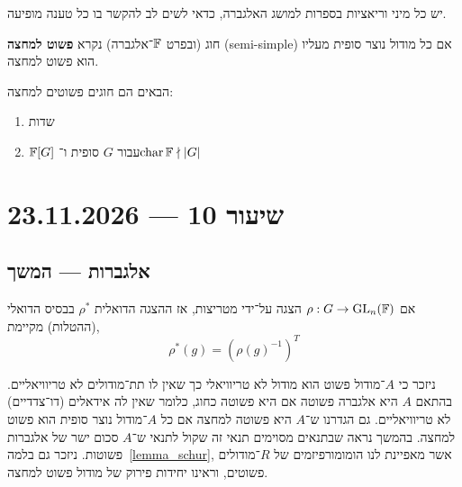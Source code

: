 \begin{remark}
	יש כל מיני וריאציות בספרות למושג האלגברה, כדאי לשים לב להקשר בו כל טענה מופיעה.
\end{remark}
\begin{definition}
	חוג (ובפרט $\mathbb{F}$־אלגברה) נקרא \textbf{פשוט למחצה} (semi-simple) אם כל מודול נוצר סופית מעליו הוא פשוט למחצה.
\end{definition}
\begin{example}
	הבאים הם חוגים פשוטים למחצה:
	\begin{enumerate}
		\item שדות
		\item $\mathbb{F}[G]$ עבור $G$ סופית ו־$\operatorname{char} \mathbb{F} \nmid |G|$
	\end{enumerate}
\end{example}

\section{שיעור 10 --- 23.11.2026}
\subsection{אלגברות --- המשך}
\begin{remark}
	אם $\rho : G \to \operatorname{GL}_n(\mathbb{F})$ הצגה על־ידי מטריצות, אז ההצגה הדואלית $\rho^*$ בבסיס הדואלי (ההטלות) מקיימת,
	\[
		\rho^*(g)
		= {(\rho{(g)}^{-1})}^T
	\]
\end{remark}
ניזכר כי $A$־מודול פשוט הוא מודול לא טריוויאלי כך שאין לו תת־מודולים לא טריוויאליים.
בהתאם $A$ היא אלגברה פשוטה אם היא פשוטה כחוג, כלומר שאין לה אידאלים (דו־צדדיים) לא טריוויאליים.
גם הגדרנו ש־$A$ היא פשוטה למחצה אם כל $A$־מודול נוצר סופית הוא פשוט למחצה.
בהמשך נראה שבתנאים מסוימים תנאי זה שקול לתנאי ש־$A$ סכום ישר של אלגברות פשוטות.
ניזכר גם בלמה\ \ref{lemma_schur}, אשר מאפיינת לנו הומומורפיזמים של $R$־מודולים פשוטים, וראינו יחידות פירוק של מודול פשוט למחצה.

